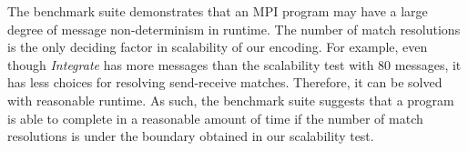 The benchmark suite demonstrates that an MPI program may have a large degree of message non-determinism in runtime. The number of match resolutions is the only deciding factor in scalability of our encoding. For example, even though \textit{Integrate} has more messages than the scalability test with 80 messages, it has less choices for resolving send-receive matches. Therefore, it can be solved with reasonable runtime. As such, the benchmark suite suggests that a program is able to complete in a reasonable amount of time if the number of match resolutions is under the boundary obtained in our scalability test.

